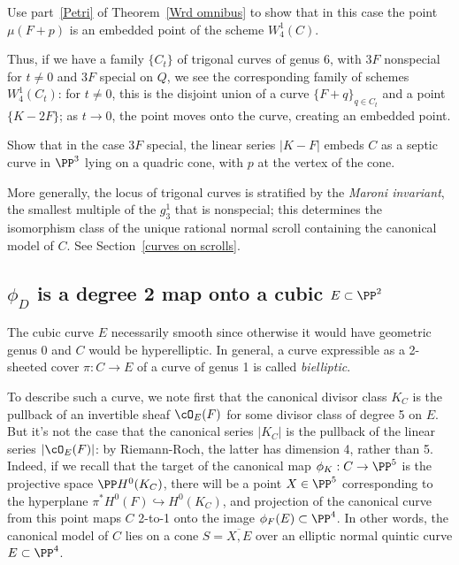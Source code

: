 \begin{exercise}
Use part~\ref{Petri} of Theorem~\ref{Wrd omnibus} to show that in this case the point $\mu(F+p)$ is an embedded point of the scheme $W^1_4(C)$.
\end{exercise} 

Thus, if we have a family $\{C_t\}$ of trigonal curves of genus 6, with $3F$ nonspecial for $t \neq 0$ and $3F$ special on $Q$, we see the corresponding family of schemes $W^1_4(C_t)$: for $t \neq 0$, this is the disjoint union of a curve $\{F+q\}_{q \in C_t}$ and a point $\{K-2F\}$; as $t \to 0$, the point moves onto the curve, creating an embedded point.

\begin{exercise}
Show that in the case $3F$ special, the linear series $|K-F|$ embeds $C$ as a septic curve in $\PP^3$ lying on a quadric cone, with $p$ at the vertex of the cone.
\end{exercise}

More generally, the locus of trigonal curves is stratified by  the \emph{Maroni invariant}, the smallest multiple  of the $g^1_3$ that is nonspecial; this determines the isomorphism class of the unique rational normal scroll containing the canonical model of $C$. See Section~\ref{curves on scrolls}. 

\subsection{$\phi_{D} $ is a degree 2 map onto a cubic $E\subset \PP^{2}$}

The cubic curve $E$ necessarily smooth since otherwise it would have geometric genus 0 and $C$ would be  hyperelliptic. In general, a curve expressible as a 2-sheeted cover $\pi : C \to E$ of a curve of genus 1 is called \emph{bielliptic}.

To describe such a curve, we note first that the canonical divisor class $K_C$ is the pullback of an invertible sheaf $\cO_E(F)$ for some divisor class of degree 5 on $E$. But it's not the case that the canonical series $|K_C|$ is the pullback of the linear series $|\cO_E(F)|$: by Riemann-Roch, the latter has dimension 4, rather than 5. Indeed, if we recall that the target of the canonical map $\phi_K : C \to \PP^5$ is the projective space $\PP H^0(K_C)$, there will be a point $X \in \PP^5$ corresponding to the hyperplane $\pi^*H^0(F) \hookrightarrow H^0(K_C)$, and projection of the canonical curve from this point maps $C$ 2-to-1 onto the image $\phi_F(E) \subset \PP^4$. In other words, the canonical model of $C$ lies on a cone $S = \overline{X, E}$ over an elliptic normal quintic curve $E \subset \PP^4$.

